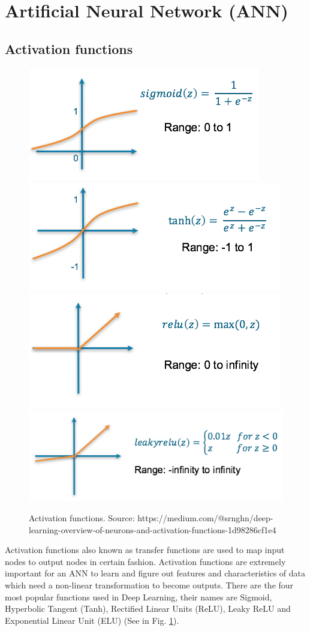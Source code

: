\documentclass[a4paper,13pt,2p]{report}
\begin{document}
\section{Artificial Neural Network (ANN)}
\label{sec:ann}
\subsection{Activation functions}
\label{ann_act_func}

\begin{figure}[!ht] 
   \centering
   \includegraphics[width=0.33\linewidth]{png/sigmoid}
   \includegraphics[width=0.33\linewidth]{png/tanh}
   \includegraphics[width=0.33\linewidth]{png/relu}
   \includegraphics[width=0.33\linewidth]{png/leakyrelu}
  \caption{Activation functions. Source: https://medium.com/@srnghn/deep-learning-overview-of-neurons-and-activation-functions-1d98286cf1e4} 
  \label{fig_activation} 
\end{figure}

	Activation functions also known as transfer functions are used to map input nodes to output nodes in certain fashion. Activation functions are extremely important for an ANN to learn and figure out features and characteristics of data which need a non-linear transformation to become outputs. There are the four most popular functions used in Deep Learning, their names are Sigmoid, Hyperbolic Tangent (Tanh), Rectified Linear Units (ReLU), Leaky ReLU and Exponential Linear Unit (ELU) (See in Fig. \ref{fig_activation}).
\end{document}
